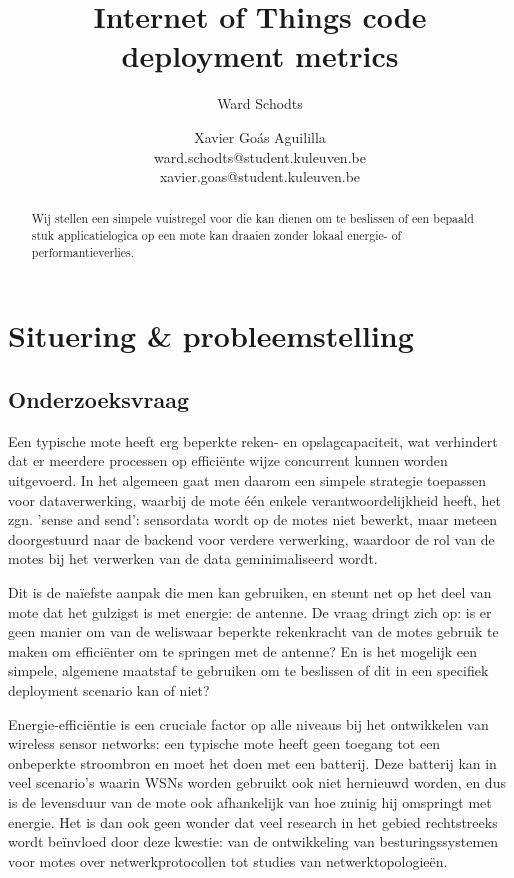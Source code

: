 \documentclass{article}
\title{Internet of Things code deployment metrics}
\author{Ward Schodts \and Xavier Go\'as Aguililla \\ ward.schodts@student.kuleuven.be \\ xavier.goas@student.kuleuven.be}
\begin{document}
\maketitle

\listoftodos

\begin{abstract}
Wij stellen een simpele vuistregel voor die kan dienen om te beslissen of een
bepaald stuk applicatielogica op een mote kan draaien zonder lokaal energie- of
performantieverlies. 
  
\end{abstract}

\section{Situering \& probleemstelling}


\subsection{Onderzoeksvraag}

Een typische mote heeft erg beperkte reken- en opslagcapaciteit, wat verhindert
dat er meerdere processen op effici\"ente wijze concurrent kunnen worden
uitgevoerd. In het algemeen gaat men daarom een simpele strategie toepassen voor
dataverwerking, waarbij de mote \'e\'en enkele verantwoordelijkheid heeft, het
zgn. 'sense and send': sensordata wordt op de motes niet bewerkt, maar meteen
doorgestuurd naar de backend voor verdere verwerking, waardoor de rol van de
motes bij het verwerken van de data geminimaliseerd wordt.

Dit is de na\"iefste aanpak die men kan gebruiken, en steunt net op het deel van
mote dat het gulzigst is met energie: de antenne.  De vraag dringt zich op: is
er geen manier om van de weliswaar beperkte rekenkracht van de motes gebruik te
maken om effici\"enter om te springen met de antenne? En is het mogelijk een
simpele, algemene maatstaf te gebruiken om te beslissen of dit in een specifiek
deployment scenario kan of niet?

Energie-effici\"entie is een cruciale factor op alle niveaus bij het
ontwikkelen van wireless sensor networks: een typische mote heeft geen toegang
tot een onbeperkte stroombron en moet het doen met een batterij. Deze batterij
kan in veel scenario's waarin WSNs worden gebruikt ook niet hernieuwd worden, en
dus is de levensduur van de mote ook afhankelijk van hoe zuinig hij omspringt
met energie. Het is dan ook geen wonder dat veel research in het gebied
rechtstreeks wordt be\"invloed door deze kwestie: van de ontwikkeling van
besturingssystemen voor motes over netwerkprotocollen tot studies van
netwerktopologie\"en.
\end{document}
